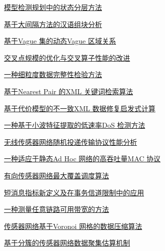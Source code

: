 \documentclass[a4paper]{article}
\begin{document}
\href{http://www.jos.org.cn/ch/reader/download_pdf.aspx?file_no=3351&year_id=2009&quarter_id=4&falg=1}{模型检测规划中的状态分层方法}

\href{http://www.jos.org.cn/ch/reader/download_pdf.aspx?file_no=3233&year_id=2009&quarter_id=4&falg=1}{基于大间隔方法的汉语组块分析}

\href{http://www.jos.org.cn/ch/reader/download_pdf.aspx?file_no=3326&year_id=2009&quarter_id=4&falg=1}{基于Vague 集的动态Vague 区域关系}

\href{http://www.jos.org.cn/ch/reader/download_pdf.aspx?file_no=3328&year_id=2009&quarter_id=4&falg=1}{交叉点规模的优化与交叉算子性能的改进}

\href{http://www.jos.org.cn/ch/reader/download_pdf.aspx?file_no=3394&year_id=2009&quarter_id=4&falg=1}{一种细粒度数据完整性检验方法}

\href{http://www.jos.org.cn/ch/reader/download_pdf.aspx?file_no=3224&year_id=2009&quarter_id=4&falg=1}{基于Nearest Pair 的XML 关键词检索算法}

\href{http://www.jos.org.cn/ch/reader/download_pdf.aspx?file_no=3225&year_id=2009&quarter_id=4&falg=1}{基于代价模型的不一致XML 数据修复启发式计算}

\href{http://www.jos.org.cn/ch/reader/download_pdf.aspx?file_no=3302&year_id=2009&quarter_id=4&falg=1}{一种基于小波特征提取的低速率DoS 检测方法}

\href{http://www.jos.org.cn/ch/reader/download_pdf.aspx?file_no=3265&year_id=2009&quarter_id=4&falg=1}{无线传感器网络随机投递传输协议性能分析}

\href{http://www.jos.org.cn/ch/reader/download_pdf.aspx?file_no=3309&year_id=2009&quarter_id=4&falg=1}{一种适应于静态Ad Hoc 网络的高吞吐量MAC 协议}

\href{http://www.jos.org.cn/ch/reader/download_pdf.aspx?file_no=3240&year_id=2009&quarter_id=4&falg=1}{有向传感器网络最大覆盖调度算法}

\href{http://www.jos.org.cn/ch/reader/download_pdf.aspx?file_no=3246&year_id=2009&quarter_id=4&falg=1}{短消息指标新定义及在事务信道限制中的应用}

\href{http://www.jos.org.cn/ch/reader/download_pdf.aspx?file_no=3306&year_id=2009&quarter_id=4&falg=1}{一种测量任意链路可用带宽的方法}

\href{http://www.jos.org.cn/ch/reader/download_pdf.aspx?file_no=3264&year_id=2009&quarter_id=4&falg=1}{传感器网络基于Voronoi 网格的数据压缩算法}

\href{http://www.jos.org.cn/ch/reader/download_pdf.aspx?file_no=3282&year_id=2009&quarter_id=4&falg=1}{基于分簇的传感器网络数据聚集估算机制}
\end{document}
